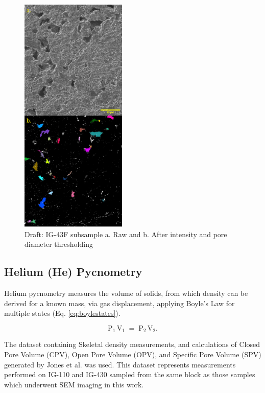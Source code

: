 \documentclass[review]{elsarticle}
\begin{document}
\begin{figure}[!htbp]
    \centering
    \includegraphics[width=0.45\textwidth]{./Media/C1-ig430f fused cropped 8 bit one color threshed subsample 2um areathresh}
    \caption{Draft: IG-43F subsample a. Raw and b. After intensity and pore diameter thresholding}
    \label{fig:C1-ig430f fused cropped 8 bit one color threshed subsample 2um areathresh}
\end{figure}

\subsection{Helium (He) Pycnometry}

Helium pycnometry measures the volume of solids, from which density can be
derived for a known mass, via gas displacement, applying Boyle's Law for
multiple states (Eq. \ref{eq:boylestates}). 

\begin{equation} \label{eq:boylestates}
  \mathrm{P}_{1}\,\mathrm{V}_{1} \;=\; \mathrm{P}_{2}\,\mathrm{V}_{2}.
\end{equation}

The dataset containing Skeletal density measurements, and calculations of Closed
Pore Volume (CPV), Open Pore Volume (OPV), and Specific Pore Volume (SPV)
generated by Jones et al. \citep{Jones2018} was used. This dataset represents
measurements performed on IG-110 and IG-430 sampled from the same block as those
samples which underwent SEM imaging in this work.
\end{document}
